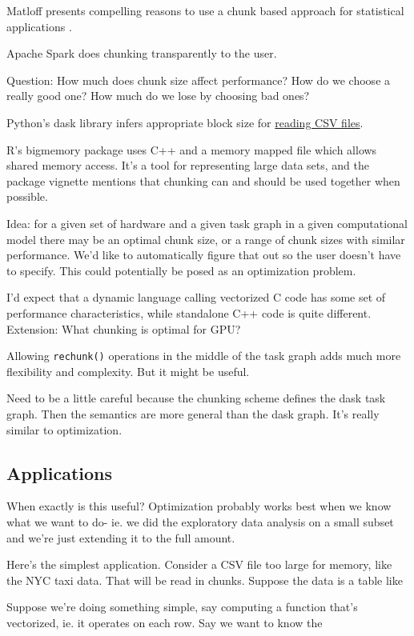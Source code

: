 \documentclass[12pt]{article}
\begin{document}
Matloff presents compelling reasons to use a chunk based
approach for statistical applications \cite{matloff2014software}.

Apache Spark does chunking transparently to the user.


Question: How much does chunk size affect performance? How do we choose a
really good one? How much do we lose by choosing bad ones?

Python's dask library infers appropriate block size for
\href{https://github.com/dask/dask/pull/1328}{reading CSV files}.

R's bigmemory package uses C++ and a memory mapped file which allows shared
memory access. \cite{kane2010bigmemory} It's a tool for representing large
data sets, and the package vignette mentions that chunking can and should
be used together when possible.

Idea: for a given set of hardware and a given task graph in a given
computational model there may be
an optimal chunk size, or a range of chunk sizes with similar performance.
We'd like to automatically figure that out so the user doesn't have to
specify. This could potentially be posed as an optimization problem.

I'd expect that a dynamic language calling vectorized C code has some set
of performance characteristics, while standalone C++ code is quite
different.
Extension: What chunking is optimal for GPU?

Allowing \texttt{rechunk()} operations in the middle of the task graph adds
much more flexibility and complexity. But it might be useful.

Need to be a little careful because the chunking scheme defines the dask
task graph. Then the semantics are more general than the dask graph. It's
really similar to optimization.

\subsection{Applications}

When exactly is this useful? Optimization probably works best when we know what we want
to do- ie. we did the exploratory data analysis on a small subset and we're
just extending it to the full amount.

Here's the simplest application.
Consider a CSV file too large for memory, like the NYC taxi data. 
That will
be read in chunks. Suppose the data is a table like 

Suppose we're doing something simple, say computing a
function that's vectorized, ie. it operates on each row. Say we want to
know the 
\end{document}
